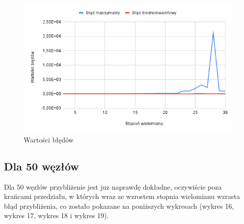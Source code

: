 \documentclass{article}
\begin{document}
\begin{figure}[H]
  \centering
  \begin{minipage}[b]{0.4\textwidth}
    \includegraphics[width=\textwidth]{img16.png}
    \caption{Wartości błędów}
  \end{minipage}
\end{figure}

\newpage

\subsection{Dla 50 węzłów}

Dla 50 węzłów przybliżenie jest juz naprawdę dokładne, oczywiście poza krańcami przedziału, w których wraz ze wzrostem stopnia wielomianu wzrasta błąd przybliżenia, co zostało pokazane na poniższych wykresach (wykres 16, wykres 17, wykres 18 i wykres 19).
\end{document}
